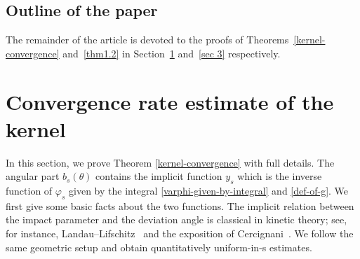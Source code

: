 \documentclass[reqno,10pt]{amsart}
\let\vf=\varphi
\def\th{\theta}
\theoremstyle{definition}
\numberwithin{equation}{section}
\begin{document}
\subsection{Outline of the paper}

The remainder of the article is devoted to the proofs of 
Theorems~\ref{kernel-convergence} and~\ref{thm1.2} in Section~\ref{sec 2} and~\ref{sec 3} respectively.

%

\section{Convergence rate estimate of the kernel}\label{sec 2}

In this section, we prove Theorem \ref{kernel-convergence} with full details.   The angular part
$b_s(\th)$ contains the implicit function $y_s$ which is the inverse function of $\vf_s$ given by the integral \eqref{varphi-given-by-integral} and \eqref{def-of-g}. We first give some basic facts about the two functions. The implicit relation between the impact parameter and the deviation angle is
classical in kinetic theory; see, for instance, Landau--Lifschitz~\cite{LandauLifschitz}
and the exposition of Cercignani~\cite{Cercignani1988}.  We follow the same geometric
setup and obtain quantitatively uniform-in-s estimates.
\end{document}
